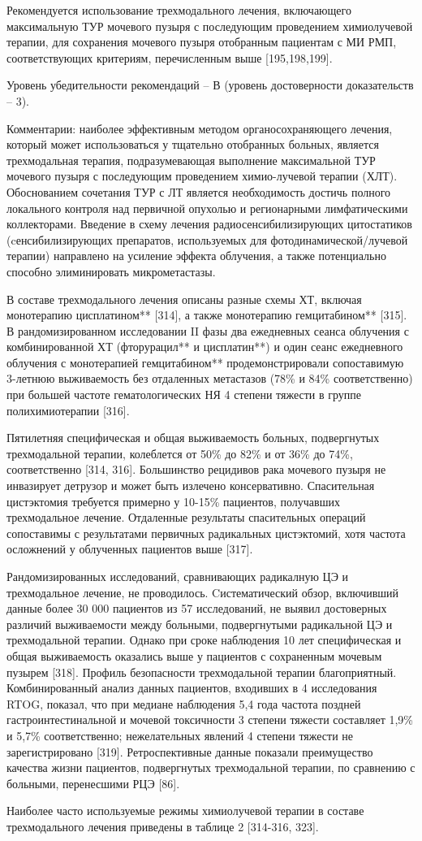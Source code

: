 Рекомендуется использование трехмодального лечения, включающего максимальную ТУР мочевого пузыря с последующим проведением химиолучевой терапии, для сохранения мочевого пузыря отобранным пациентам с МИ РМП, соответствующих критериям, перечисленным выше [195,198,199].

Уровень убедительности рекомендаций – В (уровень достоверности доказательств – 3).

Комментарии: наиболее эффективным методом органосохраняющего лечения, который может использоваться у тщательно отобранных больных, является трехмодальная терапия, подразумевающая выполнение максимальной ТУР мочевого пузыря с последующим проведением химио-лучевой терапии (ХЛТ). Обоснованием сочетания ТУР с ЛТ является необходимость достичь полного локального контроля над первичной опухолью и регионарными лимфатическими коллекторами. Введение в схему лечения радиосенсибилизирующих цитостатиков (cенсибилизирующих препаратов, используемых для фотодинамической/лучевой терапии) направлено на усиление эффекта облучения, а также потенциально способно элиминировать микрометастазы.

В составе трехмодального лечения описаны разные схемы ХТ, включая монотерапию цисплатином** [314], а также монотерапию гемцитабином** [315]. В рандомизированном исследовании II фазы два ежедневных сеанса облучения с комбинированной ХТ (фторурацил** и цисплатин**) и один сеанс ежедневного облучения с монотерапией гемцитабином** продемонстрировали сопоставимую 3-летнюю выживаемость без отдаленных метастазов (78\% и 84\% соответственно) при большей частоте гематологических НЯ 4 степени тяжести в группе полихимиотерапии [316].

Пятилетняя специфическая и общая выживаемость больных, подвергнутых трехмодальной терапии, колеблется от 50\% до 82\% и от 36\% до 74\%, соответственно [314, 316]. Большинство рецидивов рака мочевого пузыря не инвазирует детрузор и может быть излечено консервативно. Спасительная цистэктомия требуется примерно у 10-15\% пациентов, получавших трехмодальное лечение. Отдаленные результаты спасительных операций сопоставимы с результатами первичных радикальных цистэктомий, хотя частота осложнений у облученных пациентов выше [317].

Рандомизированных исследований, сравнивающих радикалную ЦЭ и трехмодальное лечение, не проводилось. Cистематический обзор, включивший данные более 30 000 пациентов из 57 исследований, не выявил достоверных различий выживаемости между больными, подвергнутыми радикальной ЦЭ и трехмодальной терапии. Однако при сроке наблюдения 10 лет специфическая и общая выживаемость оказались выше у пациентов с сохраненным мочевым пузырем [318].  Профиль безопасности трехмодальной терапии благоприятный. Комбинированный анализ данных пациентов, входивших в 4 исследования RTOG, показал, что при медиане наблюдения 5,4 года частота поздней гастроинтестинальной и мочевой токсичности 3 степени тяжести составляет 1,9\% и 5,7\% соответственно; нежелательных явлений 4 степени тяжести не зарегистрировано [319]. Ретроспективные данные показали преимущество качества жизни пациентов, подвергнутых трехмодальной терапии, по сравнению с больными, перенесшими РЦЭ [86].

Наиболее часто используемые режимы химиолучевой терапии в составе трехмодального лечения приведены в таблице 2 [314-316, 323].
